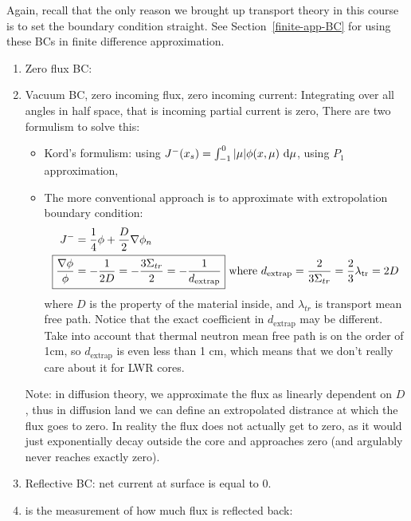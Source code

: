\documentclass{school-22.211-notes}
\begin{document}
\clearpage
{}
Again, recall that the only reason we brought up transport theory in this course is to set the boundary condition straight. See Section~\ref{finite-app-BC} for using these BCs in finite difference approximation. 
\begin{enumerate}
\item Zero flux BC:

\item Vacuum BC, zero incoming flux, zero incoming current: 
Integrating over all angles in half space, that is incoming partial current is zero, 
There are two formulism to solve this:
  \begin{itemize}
  \item Kord's formulism: using $J^- (x_s) = \int_{-1}^0 |\mu| \phi(x, \mu) \mbox{ }\mathrm{d} \mu$, using $P_1$ approximation, 
  \item The more conventional approach is to approximate with extropolation boundary condition: 
    \begin{align}
      J^- &= \frac{1}{4} \phi + \frac{D}{2} \gradient \phi_n \\
      \Aboxed{ \frac{\gradient \phi}{\phi} &= - \frac{1}{2D} = - \frac{3\Sigma_{tr}}{2} = - \frac{1}{d_{\mathrm{extrap}}}} 
\mbox{   where } d_{\mathrm{extrap}} = \frac{2}{3 \Sigma_{tr}}  = \frac{2}{3} \lambda_{\mathrm{tr}}  = 2 D
    \end{align}
    where $D$ is the property of the material inside, and $\lambda_{tr}$ is transport mean free path. Notice that the exact coefficient in $d_{\mathrm{extrap}}$ may be different. Take into account that thermal neutron mean free path is on the order of 1cm, so $d_{\mathrm{extrap}}$ is even less than 1 cm, which means that we don't really care about it for LWR cores. 
  \end{itemize}
Note: in diffusion theory, we approximate the flux as linearly dependent on $D$, thus in diffusion land we can define an extropolated distrance at which the flux goes to zero. In reality the flux does not actually get to zero, as it would just exponentially decay outside the core and approaches zero (and argulably never reaches exactly zero). 

\item Reflective BC: net current at surface is equal to 0. 

\item {} is the measurement of how much flux is reflected back: 
\end{enumerate}
\end{document}
